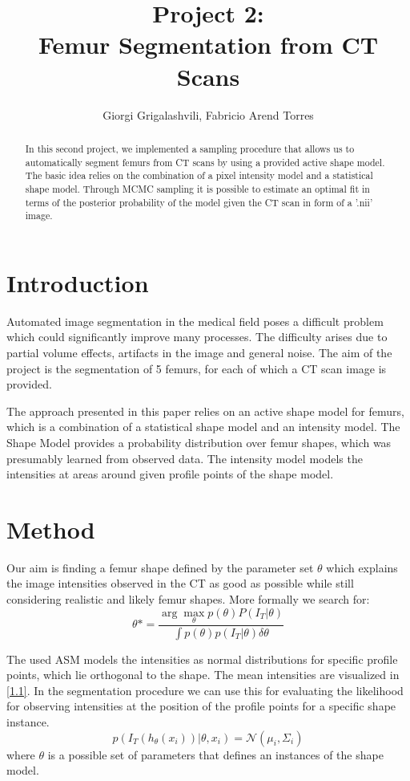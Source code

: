 \documentclass{article}
\begin{document}
	\author{Giorgi Grigalashvili, Fabricio Arend Torres}
		\title{Project 2:\\ Femur Segmentation from CT Scans}
	\maketitle
	\begin{abstract}
		In this second project, we implemented a sampling procedure that allows us to automatically segment femurs from CT scans by using a provided active shape model.
		The basic idea relies on the combination of a pixel intensity model and a statistical shape model.
		Through MCMC sampling it is possible to estimate an optimal fit in terms of the posterior probability of the model given the CT scan in form of a '.nii' image.
	\end{abstract}
	

	\section{Introduction}
	Automated image segmentation in the medical field poses a difficult problem which could significantly improve many processes.
	The difficulty arises due to partial volume effects, artifacts in the image and general noise.
	The aim of the project is the segmentation of 5 femurs, for each of which a CT scan image is provided. 
		
	The approach presented in this paper relies on an active shape model for femurs, which is a combination of a statistical shape model and an intensity model.
	The Shape Model provides a probability distribution over femur shapes, which was presumably learned from observed data.
	The intensity model models the intensities at areas around given profile points of the shape model.	


	\section{Method}
	Our aim is finding a femur shape defined by the parameter set $\theta$ which explains the image intensities observed in the CT as good as possible while still considering realistic and likely femur shapes.
	More formally we search for:
	\begin{equation}
	\theta* = \frac{\arg\max_\theta p(\theta) P(I_T | \theta)}{\int p(\theta) p(I_T | \theta) \delta\theta}
	\end{equation}	
	
	The used ASM models the intensities as normal distributions for specific profile points, which lie orthogonal to the shape.
	The mean intensities are visualized in \autoref{1.1}.
	In the segmentation procedure we can use this for evaluating the likelihood for observing intensities at the position of the profile points for a specific shape instance.
	\begin{equation}
	p(I_T (h_\theta (x_i)) | \theta,x_i ) = \mathcal{N}(\mu_i, \Sigma_i) 
	\end{equation}
	where $\theta$ is a possible set of parameters that defines an instances of the shape model.
	
\end{document}
